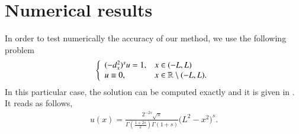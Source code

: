 \section{Numerical results} \label{res_numerical}
%
In order to test numerically the accuracy of our method, we use the following problem 
%
\begin{align}\label{PE_real}
	\left\{\begin{array}{ll}
		(-d_x^2)^{s}u = 1, & x\in(-L,L)
		\\
		u\equiv 0, & x\in\mathbb{R}\setminus(-L,L).
	\end{array}\right.
\end{align}
%
In this particular case, the solution can be computed exactly and it is given in \cite{getoor1961first}. It reads as follows, 
\begin{align}\label{real_sol}
	u(x)=\frac{2^{-2s}\sqrt{\pi}}{\Gamma\left(\frac{1+2s}{2}\right)\Gamma(1+s)}\Big(L^2-x^2\Big)^s.
\end{align}

